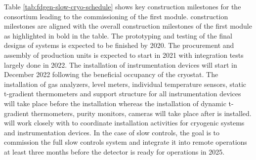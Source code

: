 
Table \ref{tab:fdgen-slow-cryo-schedule} shows key construction milestones for the  consortium leading to the commissioning of the first  module.  construction milestones are aligned with the overall construction milestones of the first  module as highlighted in bold in the table. The prototyping and testing of the final designs of  systems is expected to be finished by 2020. The procurement and assembly of production units is expected to start in 2021 with integration tests largely done in 2022. The installation of instrumentation devices will start in December 2022 following the beneficial occupancy of the cryostat. The installation of gas analyzers, level meters, individual temperature sensors, static t-gradient thermometers and support structure for all instrumentation devices will take place before the  installation whereas the installation of dynamic t-gradient thermometers, purity monitors, cameras will take place after  is installed.  will work closely with  to coordinate installation activities for cryogenic systems and instrumentation devices. In the case of slow controls, the goal is to commission the full slow controls system and integrate it into remote operations at least three months before the detector is ready for operations in 2025.  

